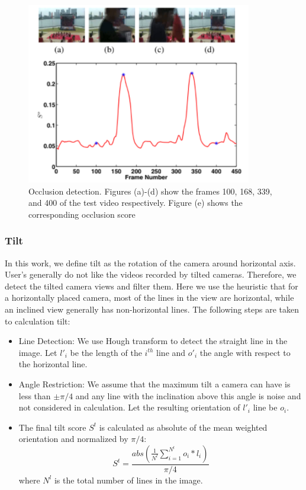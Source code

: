 \documentclass{sig-alternate}
\begin{document}
\begin{figure}
    \centering
    \includegraphics{img3.png}
    \caption{Occlusion detection. Figures (a)-(d) show the frames
100, 168, 339, and 400 of the test video respectively. Figure (e)
shows the corresponding occlusion score}
    \label{fig:fig3}
\end{figure}

\subsubsection{Tilt}
In this work, we define tilt as the rotation of the camera around horizontal axis. User's generally do not like the videos recorded by tilted cameras. Therefore, we detect the tilted camera views and filter them. Here we use the heuristic that for a horizontally placed camera, most of the lines in the view are horizontal, while an inclined view generally has non-horizontal lines. The following steps are taken to calculation tilt:
 \begin{itemize} 
    \item Line Detection: We use Hough transform to detect the straight line in the image. Let $l'_i$ be the length of the $i^{th}$ line and $o'_i$ the angle with respect to the horizontal line.
    \item Angle Restriction: We assume that the maximum tilt a camera can have is less than $\pm\pi/4$ and any line with the inclination above this angle is noise and not considered in calculation. Let the resulting orientation of $l'_i$ line be $o_i$.
    \item The final tilt score $S^t$ is calculated as absolute of the mean weighted orientation and normalized by $\pi/4$:
    \begin{equation}
        S^t=\frac{abs(\frac{1}{N^l}\sum_{i=1}^{N^l} o_i * l_i)}{\pi/4}
    \end{equation}
    where $N^l$ is the total number of lines in the image.
 \end{itemize} 
\end{document}

